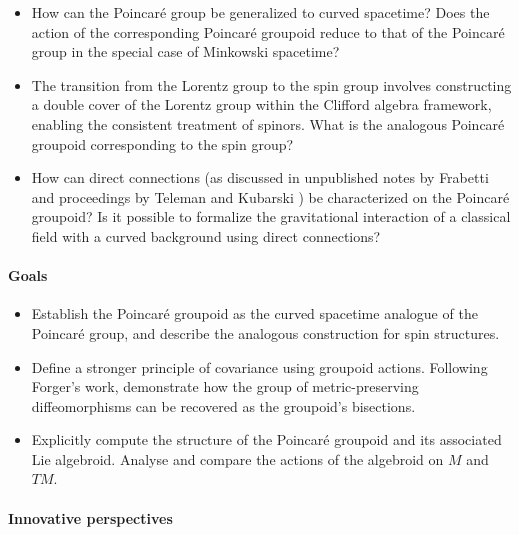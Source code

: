 \documentclass[11pt,a4paper]{article}
\begin{document}
\begin{itemize}[noitemsep, topsep=0pt, parsep=0pt, partopsep=0pt]
    \item How can the Poincaré group be generalized to curved spacetime? Does the action of the corresponding Poincaré groupoid reduce to that of the Poincaré group in the special case of Minkowski spacetime?
    \item The transition from the Lorentz group to the spin group involves constructing a double cover of the Lorentz group within the Clifford algebra framework, enabling the consistent treatment of spinors. What is the analogous Poincaré groupoid corresponding to the spin group?
    \item How can direct connections (as discussed in unpublished notes by Frabetti \cite{Azzali2022} and proceedings by Teleman \cite{Teleman2007, Teleman2004} and Kubarski \cite{Kubarski2008, Kubarski2007}) be characterized on the Poincaré groupoid? Is it possible to formalize the gravitational interaction of a classical field with a curved background using direct connections?
\end{itemize}


\paragraph{Goals}

\begin{itemize}[noitemsep, topsep=0pt, parsep=0pt, partopsep=0pt]
    \item Establish the Poincaré groupoid as the curved spacetime analogue of the Poincaré group, and describe the analogous construction for spin structures.
    \item Define a stronger principle of covariance using groupoid actions. Following Forger's work, demonstrate how the group of metric-preserving diffeomorphisms can be recovered as the groupoid's bisections.
    \item Explicitly compute the structure of the Poincaré groupoid and its associated Lie algebroid. Analyse and compare the actions of the algebroid on \( M \) and \( TM \).
\end{itemize}

\paragraph{Innovative perspectives}
\end{document}
